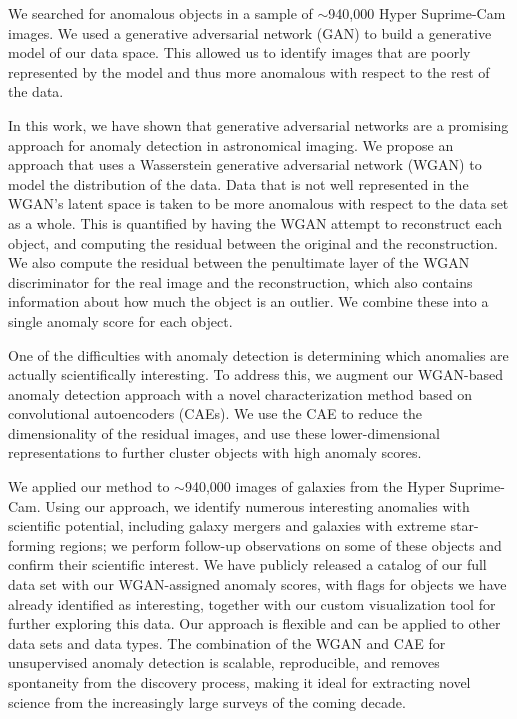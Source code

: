 \documentclass[fleqn,usenatbib,useAMS]{mnras}
\begin{document}
We searched for anomalous objects in a sample of $\sim$940,000 Hyper Suprime-Cam images.
We used a generative adversarial network (GAN) to build a generative model of our data space.
This allowed us to identify images that are poorly represented by the model and thus more anomalous with respect to the rest of the data.

In this work, we have shown that generative adversarial networks are a promising approach for anomaly detection in astronomical imaging.
We propose an approach that uses a Wasserstein generative adversarial network (WGAN) to model the distribution of the data.
Data that is not well represented in the WGAN's latent space is taken to be more anomalous with respect to the data set as a whole.
This is quantified by having the WGAN attempt to reconstruct each object, and computing the residual between the original and the reconstruction.
We also compute the residual between the penultimate layer of the WGAN discriminator for the real image and the reconstruction, which also contains information about how much the object is an outlier.
We combine these into a single anomaly score for each object.

One of the difficulties with anomaly detection is determining which anomalies are actually scientifically interesting.
To address this, we augment our WGAN-based anomaly detection approach with a novel characterization method based on convolutional autoencoders (CAEs).
We use the CAE to reduce the dimensionality of the residual images, and use these lower-dimensional representations to further cluster objects with high anomaly scores.

We applied our method to $\sim$940,000 images of galaxies from the Hyper Suprime-Cam.
Using our approach, we identify numerous interesting anomalies with scientific potential, including galaxy mergers and galaxies with extreme star-forming regions; we perform follow-up observations on some of these objects and confirm their scientific interest.
We have publicly released a catalog of our full data set with our WGAN-assigned anomaly scores, with flags for objects we have already identified as interesting, together with our custom visualization tool for further exploring this data. 
Our approach is flexible and can be applied to other data sets and data types.
The combination of the WGAN and CAE for unsupervised anomaly detection is scalable, reproducible, and removes spontaneity from the discovery process, making it ideal for extracting novel science from the increasingly large surveys of the coming decade.
\end{document}
